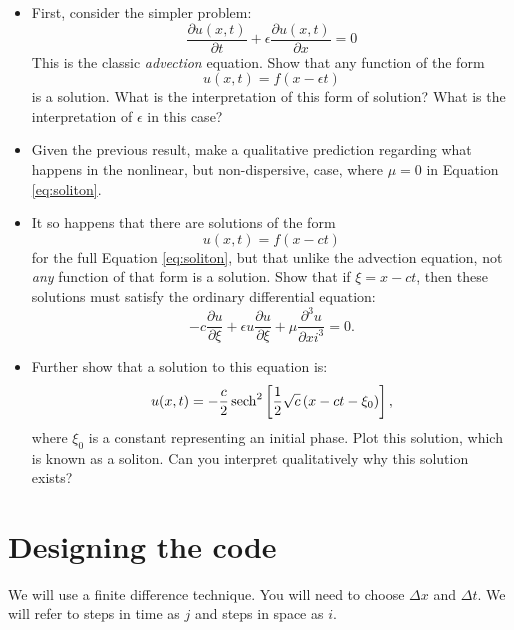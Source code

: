 \documentclass[11pt, preprint]{aastex}
\begin{document}
\begin{itemize}
\item First, consider the simpler problem:
  \begin{equation}
   \frac{\partial u(x,t)}{\partial t} + \epsilon \frac{\partial
     u(x,t)}{\partial x} = 0
  \end{equation}
This is the classic {\it advection} equation. Show that any function
of the form
   \begin{equation}
     u(x,t) = f(x- \epsilon t) 
   \end{equation}
is a solution. What is the interpretation of this form of solution?
What is the interpretation of $\epsilon$ in this case?
\item Given the previous result, make a qualitative prediction
  regarding what happens in the nonlinear, but non-dispersive, case,
  where $\mu = 0$ in Equation \ref{eq:soliton}.
\item It so happens that there are solutions of the form 
   \begin{equation}
     u(x,t) = f(x- c t) 
   \end{equation}
   for the full Equation \ref{eq:soliton}, but that unlike the
   advection equation, not {\it any} function of that form is a
   solution. Show that if $\xi = x - c t$, then these solutions must
   satisfy the ordinary differential equation:
   \begin{equation}
      - c \frac{\partial u}{\partial \xi} + \epsilon u \frac{\partial
        u}{\partial \xi} + \mu \frac{\partial^3 u}{\partial xi^3} = 0.
   \end{equation}
 \item Further show that a solution to this equation is:
   \begin{equation}
    u(x,t) = - \frac{c}{2} \operatorname{sech}^2\left[\frac{1}{2} \sqrt{c} \left(x-
      ct - \xi_0\right) \right],
   \end{equation}
   where $\xi_0$ is a constant representing an initial phase.  Plot
   this solution, which is known as a soliton. Can you interpret
   qualitatively why this solution exists?
\end{itemize}

\section{Designing the code}

We will use a finite difference technique. You will need to choose
$\Delta x$ and $\Delta t$. We will refer to steps in time as $j$ and
steps in space as $i$.
\end{document}
